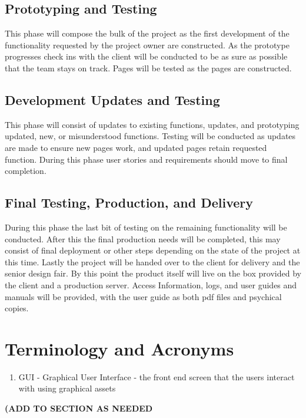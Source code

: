 \subsection{Prototyping and Testing}
This phase will compose the bulk of the project as the first development of the functionality requested by the project owner are constructed. As the prototype progresses check ins with the client will be conducted to be as sure as possible that the team stays on track. Pages will be tested as the pages are constructed.

\subsection{Development Updates and Testing}
This phase will consist of updates to existing functions, updates, and prototyping updated, new, or misunderstood functions. Testing will be conducted as updates are made to ensure new pages work, and updated pages retain requested function. During this phase user stories and requirements should move to final completion.

\subsection{Final Testing, Production, and Delivery}
During this phase the last bit of testing on the remaining functionality will be conducted. After this the final production needs will be completed, this may consist of final deployment or other steps depending on the state of the project at this time. Lastly the project will be handed over to the client for delivery and the senior design fair. By this point the product itself will live on the box provided by the client and a production server. Access Information, logs, and user guides and manuals will be provided, with the user guide as both pdf files and psychical copies.


\section{Terminology and Acronyms}
\begin{enumerate}
\item GUI - Graphical User Interface - the front end screen that the users interact with using graphical assets
\end{enumerate}
\bf(ADD TO SECTION AS NEEDED 
